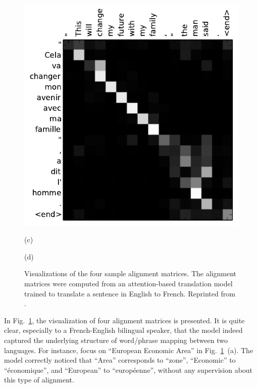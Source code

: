 \documentclass{report}
\begin{document}
\begin{figure}[ht]
\begin{minipage}[b]{0.48\textwidth}
        \includegraphics[width=1.\columnwidth]{figures/374.pdf}
    \end{minipage}

    \begin{minipage}{0.48\textwidth}
        \centering
        (c)
    \end{minipage}
    \hfill
    \begin{minipage}{0.48\textwidth}
        \centering
        (d)
    \end{minipage}

    \caption{
        Visualizations of the four sample alignment matrices. The alignment
        matrices were computed from an attention-based translation model trained
        to translate a sentence in English to French.
        Reprinted from
        \cite{bahdanau2014neural}.
    }
    \label{fig:alignment}
\end{figure}

In Fig.~\ref{fig:alignment}, the visualization of four alignment matrices is
presented. It is quite clear, especially to a French-English bilingual speaker,
that the model indeed captured the underlying structure of word/phrase mapping
between two languages. For instance, focus on ``European Economic Area'' in
Fig.~\ref{fig:alignment}~(a). The model correctly noticed that ``Area''
corresponds to ``zone'', ``Economic'' to ``\'economique'', and ``European'' to
``europ\'eenne'', without any supervision about this type of alignment.  
\end{document}
